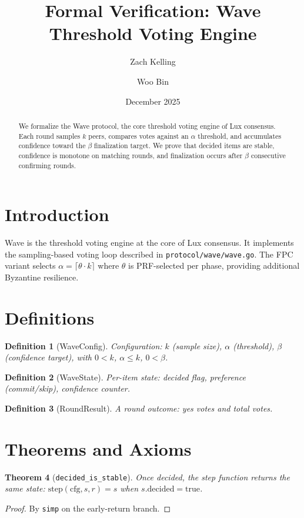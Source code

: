 \documentclass[11pt]{article}
\title{Formal Verification: Wave Threshold Voting Engine}
\author{Zach Kelling \and Woo Bin}
\date{December 2025}
\newtheorem{theorem}{Theorem}
\newtheorem{definition}[theorem]{Definition}
\begin{document}
\maketitle

\begin{abstract}
We formalize the Wave protocol, the core threshold voting engine of Lux consensus. Each round samples $k$ peers, compares votes against an $\alpha$ threshold, and accumulates confidence toward the $\beta$ finalization target. We prove that decided items are stable, confidence is monotone on matching rounds, and finalization occurs after $\beta$ consecutive confirming rounds.
\end{abstract}

\section{Introduction}
Wave is the threshold voting engine at the core of Lux consensus. It implements the sampling-based voting loop described in \texttt{protocol/wave/wave.go}. The FPC variant selects $\alpha = \lceil\theta \cdot k\rceil$ where $\theta$ is PRF-selected per phase, providing additional Byzantine resilience.

\section{Definitions}
\begin{definition}[WaveConfig]
Configuration: $k$ (sample size), $\alpha$ (threshold), $\beta$ (confidence target), with $0 < k$, $\alpha \leq k$, $0 < \beta$.
\end{definition}

\begin{definition}[WaveState]
Per-item state: decided flag, preference (commit/skip), confidence counter.
\end{definition}

\begin{definition}[RoundResult]
A round outcome: yes votes and total votes.
\end{definition}


\section{Theorems and Axioms}
\begin{theorem}[\texttt{decided\_is\_stable}]
Once decided, the step function returns the same state: $\text{step}(\text{cfg}, s, r) = s$ when $s.\text{decided} = \text{true}$.
\end{theorem}
\begin{proof}
By \texttt{simp} on the early-return branch.
\end{proof}
\end{document}
